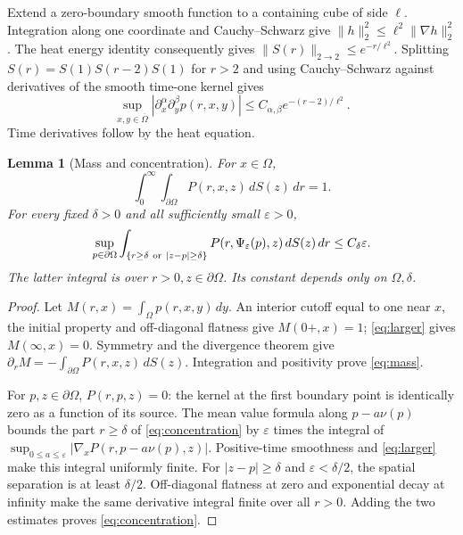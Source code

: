 \documentclass[11pt]{article}
\newtheorem{lemma}[theorem]{Lemma}
\theoremstyle{remark}
\newcommand{\Om}{\Omega}
\begin{document}
Extend a zero-boundary smooth function to a containing cube of side
$\ell$. Integration along one coordinate and Cauchy--Schwarz give
$\|h\|_2^2\leq\ell^2\|\nabla h\|_2^2$.
The heat energy identity consequently gives
$\|S(r)\|_{2\to2}\leq e^{-r/\ell^2}$.
Splitting $S(r)=S(1)S(r-2)S(1)$ for $r>2$ and using
Cauchy--Schwarz against derivatives of the smooth time-one kernel gives
\begin{equation}\label{eq:larger}
 \sup_{x,y\in\overline\Om}
 |\partial_x^\alpha\partial_y^\beta p(r,x,y)|
          \leq C_{\alpha,\beta}e^{-(r-2)/\ell^2}.
\end{equation}
Time derivatives follow by the heat equation.

\begin{lemma}[Mass and concentration]\label{lem:mass}
For $x\in\Om$,
\begin{equation}\label{eq:mass}
 \int_0^\infty\int_{\partial\Om}P(r,x,z)\,dS(z)\,dr=1.
\end{equation}
For every fixed $\delta>0$ and all sufficiently small $\varepsilon>0$,
\begin{equation}\label{eq:concentration}
 \sup_{p\in\partial\Om}
 \int_{\{r\geq\delta\ {\rm or}\ |z-p|\geq\delta\}}
 P(r,\Psi_\varepsilon(p),z)\,dS(z)\,dr
       \leq C_\delta\varepsilon .
\end{equation}
The latter integral is over $r>0,z\in\partial\Om$.
Its constant depends only on $\Om,\delta$.
\end{lemma}
\begin{proof}
Let $M(r,x)=\int_\Om p(r,x,y)\,dy$.
An interior cutoff equal to one near $x$, the initial property and
off-diagonal flatness give $M(0+,x)=1$;
\eqref{eq:larger} gives $M(\infty,x)=0$.
Symmetry and the divergence theorem give
$\partial_rM=-\int_{\partial\Om}P(r,x,z)\,dS(z)$.
Integration and positivity prove \eqref{eq:mass}.

For $p,z\in\partial\Om$, $P(r,p,z)=0$: the kernel at the first boundary
point is identically zero as a function of its source.
The mean value formula along $p-a\nu(p)$ bounds the part $r\geq\delta$
of \eqref{eq:concentration} by $\varepsilon$ times the integral of
$\sup_{0\leq a\leq\varepsilon}|\nabla_xP(r,p-a\nu(p),z)|$.
Positive-time smoothness and \eqref{eq:larger} make this integral uniformly
finite. For $|z-p|\geq\delta$ and $\varepsilon<\delta/2$, the spatial
separation is at least $\delta/2$.
Off-diagonal flatness at zero and exponential decay at infinity make the
same derivative integral finite over all $r>0$.
Adding the two estimates proves \eqref{eq:concentration}.
\end{proof}
\end{document}
